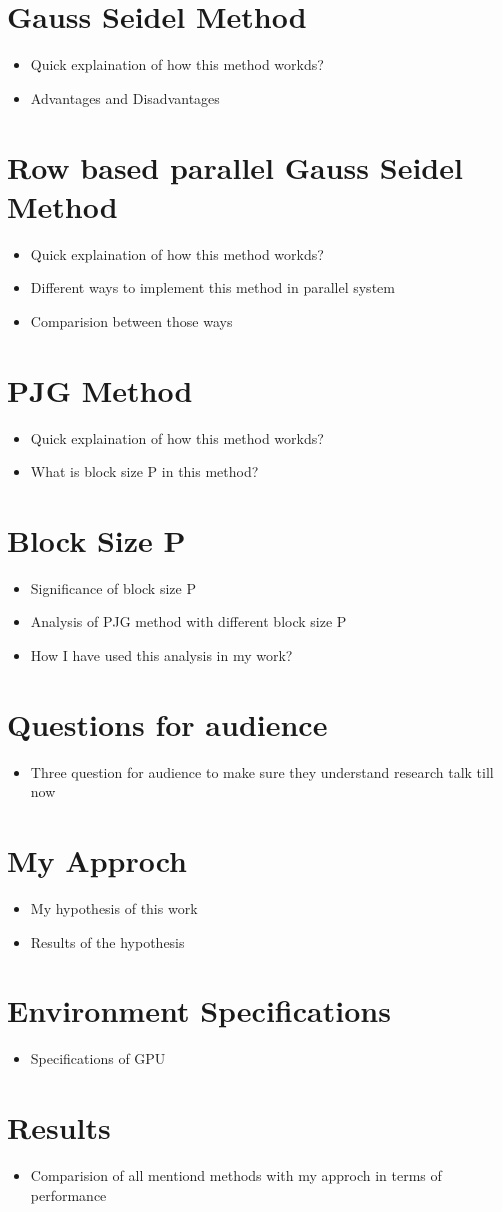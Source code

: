 \documentclass[11pt]{article}       %
\newenvironment{slide}[1]        {\section{#1} \begin{itemize}}%
                                 {\end{itemize}}
\begin{document}
\begin{slide}{Gauss Seidel Method}
\item Quick explaination of how this method workds?
\item Advantages and Disadvantages
\end{slide}

\begin{slide}{Row based parallel Gauss Seidel Method}
\item Quick explaination of how this method workds?
\item Different ways to implement this method in parallel system
\item Comparision between those ways
\end{slide}

\begin{slide}{PJG Method}
\item Quick explaination of how this method workds?
\item What is block size P in this method?
\end{slide}

\begin{slide}{Block Size P}
\item Significance of block size P
\item Analysis of PJG method with different block size P
\item How I have used this analysis in my work?
\end{slide}

\begin{slide}{Questions for audience}
\item Three question for audience to make sure they understand research talk till now
\end{slide}

\begin{slide}{My Approch}
\item My hypothesis of this work
\item Results of the hypothesis
\end{slide}

\begin{slide}{Environment Specifications}
\item Specifications of GPU
\end{slide}

\begin{slide}{Results}
\item Comparision of all mentiond methods with my approch in terms of performance
\end{slide}
\end{document}
